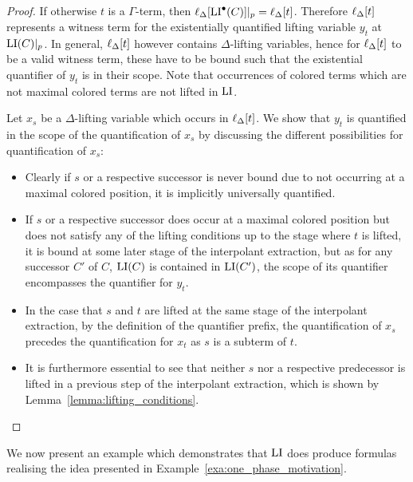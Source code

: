 \begin{proof}
	If otherwise $t$ is a $\Gamma$-term, then $\ell_{\Delta}[\operatorname{LI}^\bullet(C)]|_{p} = \ell_{\Delta}[t]$.
	Therefore $\ell_{\Delta}[t]$ represents a witness term for the existentially quantified lifting variable $y_t$ at $\operatorname{LI}(C)|_{p}$.
	In general, $\ell_{\Delta}[t]$ however contains $\Delta$-lifting variables, hence for $\ell_{\Delta}[t]$ to be a valid witness term, these have to be bound such that the existential quantifier of $y_t$ is in their scope.
	Note that occurrences of colored terms which are not maximal colored terms are not lifted in $\operatorname{LI}$.

	Let $x_s$ be a $\Delta$-lifting variable which occurs in $\ell_{\Delta}[t]$. 
	We show that $y_t$ is quantified in the scope of the quantification of $x_s$ by discussing the different possibilities for quantification of $x_s$:

	\begin{itemize}
		\item
			Clearly if $s$ or a respective successor is never bound due to not occurring at a maximal colored position, it is implicitly universally quantified.

		\item
			If $s$ or a respective successor does occur at a maximal colored position but does not satisfy any of the lifting conditions up to the stage where $t$ is lifted, it is bound at some later stage of the interpolant extraction, but as for any successor $C'$ of $C$, $\operatorname{LI}(C)$ is contained in $\operatorname{LI}(C')$, 
			the scope of its quantifier encompasses the quantifier for $y_t$.

		\item
			In the case that $s$ and $t$ are lifted at the same stage of the interpolant extraction, by the definition of the quantifier prefix, the quantification of $x_s$ precedes the quantification for $x_t$ as $s$ is a subterm of $t$.


		\item
			It is furthermore essential to see that neither $s$ nor a respective predecessor is lifted in a previous step of the interpolant extraction, which is shown by Lemma~\ref{lemma:lifting_conditions}.
			\qedhere
	\end{itemize}
\end{proof}

We now present an example which demonstrates that $\operatorname{LI}$ does produce formulas realising the idea presented in Example~\ref{exa:one_phase_motivation}.

